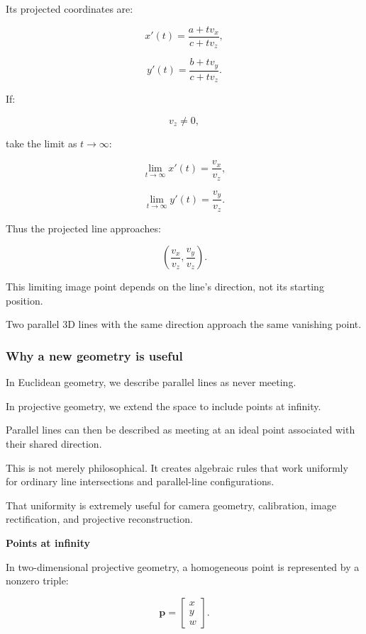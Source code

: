 Its projected coordinates are:

\[
 x'(t)=\frac{a+tv_x}{c+tv_z},
\]

\[
 y'(t)=\frac{b+tv_y}{c+tv_z}.
\]

If:

\[
 v_z\ne0,
\]

take the limit as \(t\to\infty\):

\[
 \lim_{t\to\infty}x'(t)=\frac{v_x}{v_z},
\]

\[
 \lim_{t\to\infty}y'(t)=\frac{v_y}{v_z}.
\]

Thus the projected line approaches:

\[
 \boxed{ \left( \frac{v_x}{v_z}, \frac{v_y}{v_z} \right) }.
\]

This limiting image point depends on the line's direction, not its starting position.

Two parallel 3D lines with the same direction approach the same vanishing point.

\subsubsection{Why a new geometry is useful}\label{02-foundations-ii-ch032-why-a-new-geometry-is-useful}

\hypertarget{02-foundations-ii-ch032-why-a-new-geometry-is-useful}{}

In Euclidean geometry, we describe parallel lines as never meeting.

In projective geometry, we extend the space to include points at infinity.

Parallel lines can then be described as meeting at an ideal point associated with their shared direction.

This is not merely philosophical. It creates algebraic rules that work uniformly for ordinary line intersections and parallel-line configurations.

That uniformity is extremely useful for camera geometry, calibration, image rectification, and projective reconstruction.

\textbf{Points at infinity}

In two-dimensional projective geometry, a homogeneous point is represented by a nonzero triple:

\[
 \boxed{ \mathbf p= \begin{bmatrix} x\\y\\w \end{bmatrix} }.
\]


